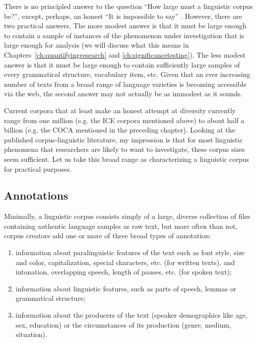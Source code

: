 There is no principled answer to the question ``How large must a linguistic corpus be?'', except, perhaps, an honest ``It is impossible to say'' \citep[130]{renouf_lexical_1987}. However, there are two practical answers. The more modest answer is that it must be large  enough to contain a sample  of instances of the phenomenon under investigation that is large enough for analysis (we will discuss what this means in Chapters~\ref{ch:quantifyingresearch} and \ref{ch:significancetesting}). The less modest answer is that it must be large  enough to contain sufficiently large samples of every grammatical structure, vocabulary item, etc. Given that an ever increasing number of texts from a broad range of language varieties  is becoming accessible via the web, the second answer may not actually be as immodest as it sounds.

Current corpora that at least make an honest attempt at diversity currently range from one million (e.g. the ICE  corpora mentioned above) to about half a billion (e.g. the COCA mentioned in the preceding chapter). Looking at the published corpus\hyp{}linguistic literature, my impression is that for most linguistic phenomena that researchers are likely to want to investigate, these corpus sizes  seem sufficient. Let us take this broad range as characterizing a linguistic corpus for practical purposes.

\subsection{Annotations}
\label{sec:annotations}

Minimally, a linguistic corpus consists simply of a large, diverse collection of files containing authentic  language samples  as raw text, but more often than not, corpus creators add one or more of three broad types of  annotation:

\begin{enumerate}
\item information about paralinguistic  features of the text such as font style, size  and color, capitalization, special characters, etc. (for written  texts), and intonation,  overlapping speech, length  of pauses, etc. (for spoken  text);
\item information about linguistic features, such as parts of speech, lemmas  or grammatical structure;
\item information about the producers of the text (speaker demographics  like age,  sex, education) or the circumstances of its production (genre,  medium,  situation).
\end{enumerate}

